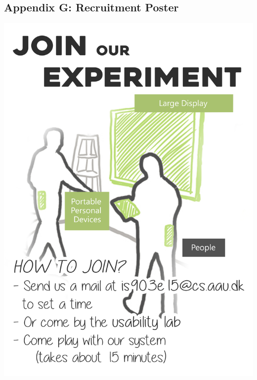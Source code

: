 \subsection{Appendix G: Recruitment Poster}
\begin{adjustbox}{width=\textwidth}
	\includegraphics{appendix/images/poster.jpg}
\end{adjustbox}